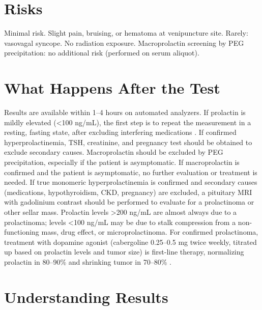 \section*{Risks}
Minimal risk. Slight pain, bruising, or hematoma at venipuncture site. Rarely: vasovagal syncope. No radiation exposure. Macroprolactin screening by PEG precipitation: no additional risk (performed on serum aliquot).

\section*{What Happens After the Test}
Results are available within 1--4 hours on automated analyzers. If prolactin is mildly elevated (<100 ng/mL), the first step is to repeat the measurement in a resting, fasting state, after excluding interfering medications \cite{vilar2008diagnosis}. If confirmed hyperprolactinemia, TSH, creatinine, and pregnancy test should be obtained to exclude secondary causes. Macroprolactin should be excluded by PEG precipitation, especially if the patient is asymptomatic. If macroprolactin is confirmed and the patient is asymptomatic, no further evaluation or treatment is needed. If true monomeric hyperprolactinemia is confirmed and secondary causes (medications, hypothyroidism, CKD, pregnancy) are excluded, a pituitary MRI with gadolinium contrast should be performed to evaluate for a prolactinoma or other sellar mass. Prolactin levels >200 ng/mL are almost always due to a prolactinoma; levels <100 ng/mL may be due to stalk compression from a non-functioning mass, drug effect, or microprolactinoma. For confirmed prolactinoma, treatment with dopamine agonist (cabergoline 0.25--0.5 mg twice weekly, titrated up based on prolactin levels and tumor size) is first-line therapy, normalizing prolactin in 80--90\% and shrinking tumor in 70--80\% \cite{klibanski2010prolactinomas}.

\section*{Understanding Results}

